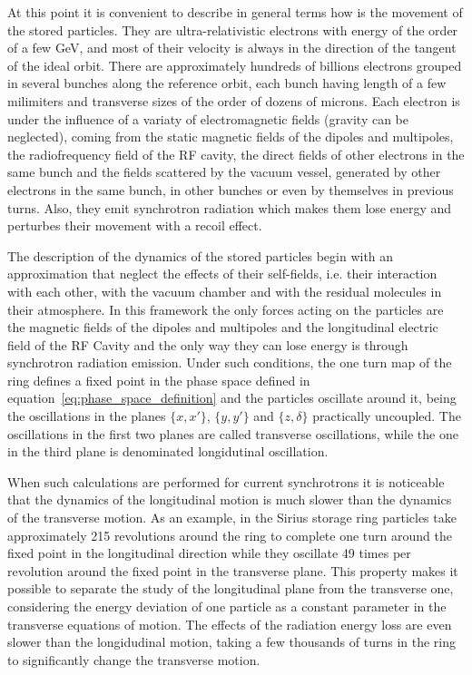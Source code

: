    At this point it is convenient to describe in general terms how is the movement of the stored particles. They are ultra-relativistic electrons with energy of the order of a few \si{GeV}, and most of their velocity is always in the direction of the tangent of the ideal orbit. There are approximately hundreds of billions electrons grouped in several bunches along the reference orbit, each bunch having length of a few milimiters and transverse sizes of the order of dozens of microns. Each electron is under the influence of a variaty of electromagnetic fields (gravity can be neglected), coming from the static magnetic fields of the dipoles and multipoles, the radiofrequency field of the RF cavity, the direct fields of other electrons in the same bunch and the fields scattered by the vacuum vessel, generated by other electrons in the same bunch, in other bunches or even by themselves in previous turns. Also, they emit synchrotron radiation which makes them lose energy and perturbes their movement with a recoil effect.

    The description of the dynamics of the stored particles begin with an approximation that neglect the effects of their self-fields, i.e. their interaction with each other, with the vacuum chamber and with the residual molecules in their atmosphere. In this framework the only forces acting on the particles are the magnetic fields of the dipoles and multipoles and the longitudinal electric field of the RF Cavity and the only way they can lose energy is through synchrotron radiation emission. Under such conditions, the one turn map of the ring defines a fixed point in the phase space defined in equation~\eqref{eq:phase_space_definition} and the particles oscillate around it, being the oscillations in the planes $\{x,x'\}$, $\{y,y'\}$ and $\{z,\delta\}$ practically uncoupled. The oscillations in the first two planes are called transverse oscillations, while the one in the third plane is denominated longidutinal oscillation.

    When such calculations are performed for current synchrotrons it is noticeable that the dynamics of the longitudinal motion is much slower than the dynamics of the transverse motion. As an example, in the Sirius storage ring particles take approximately 215 revolutions around the ring to complete one turn around the fixed point in the longitudinal direction while they oscillate 49 times per revolution around the fixed point in the transverse plane. This property makes it possible to separate the study of the longitudinal plane from the transverse one, considering the energy deviation of one particle as a constant parameter in the transverse equations of motion. The effects of the radiation energy loss are even slower than the longidudinal motion, taking a few thousands of turns in the ring to significantly change the transverse motion.

